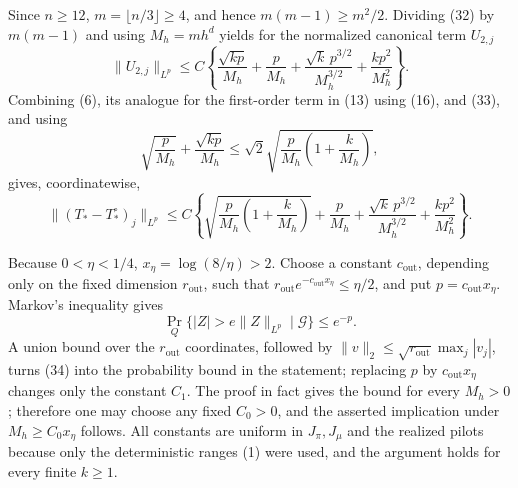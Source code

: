 Since \(n\geq12\), \(m=\lfloor n/3\rfloor\geq4\), and hence \(m(m-1)\geq m^2/2\).  Dividing (32) by \(m(m-1)\) and using \(M_h=mh^d\) yields for the normalized canonical term \(U_{2,j}\)
\[
 \|U_{2,j}\|_{L^p}
 \leq C\left\{
 \frac{\sqrt{kp}}{M_h}+\frac p{M_h}
 +\frac{\sqrt{k}\,p^{3/2}}{M_h^{3/2}}
 +\frac{kp^2}{M_h^2}\right\}.
\tag{33}
\]
Combining (6), its analogue for the first-order term in (13) using (16), and (33), and using
\[
 \sqrt{\frac p{M_h}}+\frac{\sqrt{kp}}{M_h}
 \leq\sqrt2\sqrt{\frac p{M_h}\left(1+\frac{k}{M_h}\right)},
\]
gives, coordinatewise,
\[
 \|(T_*-T_*^\circ)_j\|_{L^p}
 \leq C\left\{
 \sqrt{\frac p{M_h}\left(1+\frac{k}{M_h}\right)}
 +\frac p{M_h}
 +\frac{\sqrt{k}\,p^{3/2}}{M_h^{3/2}}
 +\frac{kp^2}{M_h^2}\right\}.
\tag{34}
\]

Because \(0<\eta<1/4\), \(x_\eta=\log(8/\eta)>2\).  Choose a constant \(c_{\mathrm{out}}\), depending only on the fixed dimension \(r_{\mathrm{out}}\), such that \(r_{\mathrm{out}}e^{-c_{\mathrm{out}}x_\eta}\leq\eta/2\), and put \(p=c_{\mathrm{out}}x_\eta\).  Markov's inequality gives
\[
 \Pr_Q\{|Z|>e\|Z\|_{L^p}\mid\mathcal G\}\leq e^{-p}.
\]
A union bound over the \(r_{\mathrm{out}}\) coordinates, followed by
\(\|v\|_2\leq\sqrt{r_{\mathrm{out}}}\max_j|v_j|\), turns (34) into the probability bound in the statement; replacing \(p\) by \(c_{\mathrm{out}}x_\eta\) changes only the constant \(C_1\).  The proof in fact gives the bound for every \(M_h>0\); therefore one may choose any fixed \(C_0>0\), and the asserted implication under \(M_h\geq C_0x_\eta\) follows.  All constants are uniform in \(J_\pi,J_\mu\) and the realized pilots because only the deterministic ranges (1) were used, and the argument holds for every finite \(k\geq1\).
